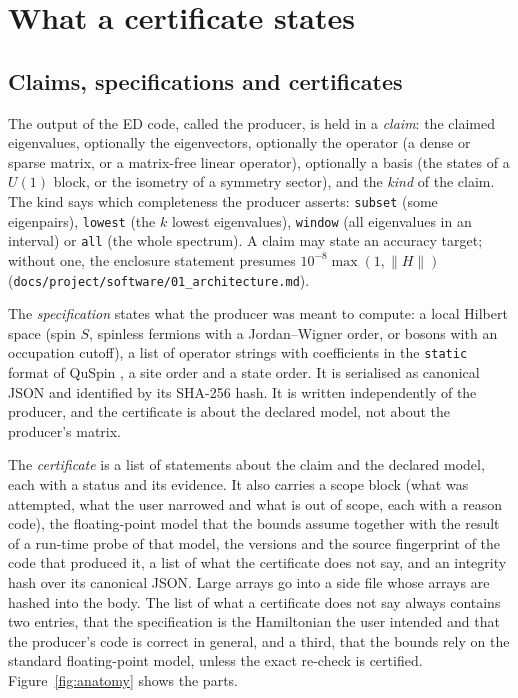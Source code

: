 \documentclass[11pt,a4paper]{article}
\newcommand{\code}[1]{\texttt{#1}}
\newcommand{\norm}[1]{\lVert #1\rVert}
\begin{document}
\section{What a certificate states}
\label{sec:certificate}

\subsection{Claims, specifications and certificates}

The output of the ED code, called the producer, is held in a \emph{claim}: the claimed eigenvalues, optionally the
eigenvectors, optionally the operator (a dense or sparse matrix, or a matrix-free linear operator), optionally a basis
(the states of a $U(1)$ block, or the isometry of a symmetry sector), and the \emph{kind} of the claim. The kind says
which completeness the producer asserts: \code{subset} (some eigenpairs), \code{lowest} (the $k$ lowest eigenvalues),
\code{window} (all eigenvalues in an interval) or \code{all} (the whole spectrum). A claim may state an accuracy target;
without one, the enclosure statement presumes $10^{-8}\max(1,\norm{H})$
(\code{docs/project/software/01\_architecture.md}).

The \emph{specification} states what the producer was meant to compute: a local Hilbert space (spin $S$, spinless
fermions with a Jordan--Wigner order, or bosons with an occupation cutoff), a list of operator strings with
coefficients in the \code{static} format of QuSpin \cite{QuSpin1,QuSpin2}, a site order and a state order. It is
serialised as canonical JSON and identified by its SHA-256 hash. It is written independently of the producer, and the
certificate is about the declared model, not about the producer's matrix.

The \emph{certificate} is a list of statements about the claim and the declared model, each with a status and its
evidence. It also carries a scope block (what was attempted, what the user narrowed and what is out of scope, each
with a reason code), the floating-point model that the bounds assume together with the result of a run-time probe of
that model, the versions and the source fingerprint of the code that produced it, a list of what the certificate does
not say, and an integrity hash over its canonical JSON. Large arrays go into a side file whose arrays are hashed into
the body. The list of what a certificate does not say always contains two entries, that the specification is the
Hamiltonian the user intended and that the producer's code is correct in general, and a third, that the bounds rely on
the standard floating-point model, unless the exact re-check is certified. Figure~\ref{fig:anatomy} shows the parts.
\end{document}
